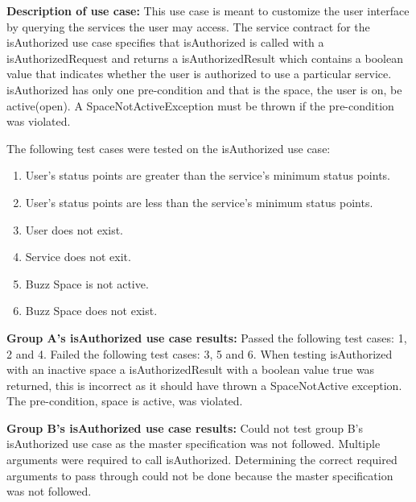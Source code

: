 \textbf{Description of use case:}\newline
This use case is meant to customize the user interface by querying the services the user may access. The service contract for the isAuthorized use case specifies that isAuthorized is called with a isAuthorizedRequest and returns a isAuthorizedResult which contains a boolean value that indicates whether the user is authorized to use a particular service. isAuthorized has only one pre-condition and that is the space, the user is on, be active(open). A SpaceNotActiveException must be thrown if the pre-condition was violated.
\medskip

\noindent
The following test cases were tested on the isAuthorized use case:
\begin{enumerate}
	\item User's status points are greater than the service's minimum status points.
	\item User's status points are less than the service's minimum status points.
	\item User does not exist.
  	\item Service does not exit.
  	\item Buzz Space is not active.
  	\item Buzz Space does not exist.
\end{enumerate}
\medskip
\noindent
\textbf{Group A's isAuthorized use case results:}\newline
Passed the following test cases: 1, 2 and 4.\newline
Failed the following test cases: 3, 5 and 6.\newline
When testing isAuthorized with an inactive space a isAuthorizedResult with a boolean value true was returned, this is incorrect as it should have thrown a SpaceNotActive exception. The pre-condition, space is active, was violated.
\medskip

\noindent
\textbf{Group B's isAuthorized use case results:}\newline
Could not test group B's isAuthorized use case as the master specification was not followed. Multiple arguments were required to call isAuthorized. Determining the correct required arguments to pass through could not be done because the master specification was not followed.